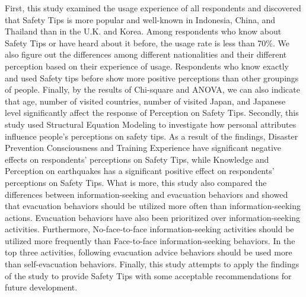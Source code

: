 First, this study examined the usage experience of all respondents and discovered that Safety Tips is more popular and well-known in Indonesia, China, and Thailand than in the U.K. and Korea. Among respondents who know about Safety Tips or have heard about it before, the usage rate is less than 70\%. We also figure out the differences among different nationalities and their different perception based on their experience of usage. Respondents who know exactly and used Safety tips before show more positive perceptions than other groupings of people. Finally, by the results of Chi-square and ANOVA, we can also indicate that age, number of visited countries, number of visited Japan, and Japanese level significantly affect the response of Perception on Safety Tips. Secondly, this study used Structural Equation Modeling to investigate how personal attributes influence people's perceptions on safety tips. As a result of the findings, Disaster Prevention Consciousness and Training Experience have significant negative effects on respondents' perceptions on Safety Tips, while Knowledge and Perception on earthquakes has a significant positive effect on respondents' perceptions on Safety Tips. What is more, this study also compared the differences between information-seeking and evacuation behaviors and showed that evacuation behaviors should be utilized more often than information-seeking actions. Evacuation behaviors have also been prioritized over information-seeking activities. Furthermore, No-face-to-face information-seeking activities should be utilized more frequently than Face-to-face information-seeking behaviors. In the top three activities, following evacuation advice behaviors should be used more than self-evacuation behaviors. Finally, this study attempts to apply the findings of the study to provide Safety Tips with some acceptable recommendations for future development. 


\cleardoublepage
